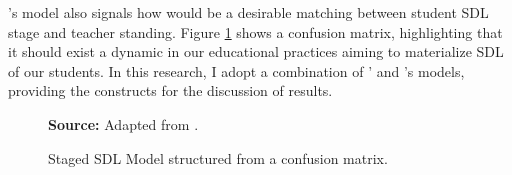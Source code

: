 's model also signals how would be a desirable matching between student \gls{SDL} stage and teacher standing. Figure \ref{fig:ssdl-matrix} shows a confusion matrix, highlighting that it should exist a dynamic in our educational practices aiming to materialize \gls{SDL} of our students. In this research, I adopt a combination of ’ and 's models, providing the constructs for the discussion of results.

\begin{figure}[ht!]
\centering

\caption{\textmd{Staged \acrshort{SDL} Model structured from a confusion matrix.}}
\label{fig:ssdl-matrix}

\par\medskip\ABNTEXfontereduzida\selectfont\textbf{Source:} Adapted from \cite{grow:1991}.%
\end{figure}